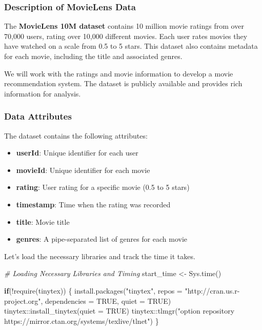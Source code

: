 \documentclass[
]{article}
\newenvironment{Shaded}{}{}
\newcommand{\AttributeTok}[1]{\textcolor[rgb]{0.49,0.56,0.16}{#1}}
\newcommand{\CommentTok}[1]{\textcolor[rgb]{0.38,0.63,0.69}{\textit{#1}}}
\newcommand{\ConstantTok}[1]{\textcolor[rgb]{0.53,0.00,0.00}{#1}}
\newcommand{\ControlFlowTok}[1]{\textcolor[rgb]{0.00,0.44,0.13}{\textbf{#1}}}
\newcommand{\FunctionTok}[1]{\textcolor[rgb]{0.02,0.16,0.49}{#1}}
\newcommand{\NormalTok}[1]{#1}
\newcommand{\OtherTok}[1]{\textcolor[rgb]{0.00,0.44,0.13}{#1}}
\newcommand{\SpecialCharTok}[1]{\textcolor[rgb]{0.25,0.44,0.63}{#1}}
\newcommand{\StringTok}[1]{\textcolor[rgb]{0.25,0.44,0.63}{#1}}
\providecommand{\tightlist}{%
  \setlength{\itemsep}{0pt}\setlength{\parskip}{0pt}}
\begin{document}
\subsubsection{Description of MovieLens
Data}\label{description-of-movielens-data}

The \textbf{MovieLens 10M dataset} contains 10 million movie ratings
from over 70,000 users, rating over 10,000 different movies. Each user
rates movies they have watched on a scale from 0.5 to 5 stars. This
dataset also contains metadata for each movie, including the title and
associated genres.

We will work with the ratings and movie information to develop a movie
recommendation system. The dataset is publicly available and provides
rich information for analysis.

\subsubsection{Data Attributes}\label{data-attributes}

The dataset contains the following attributes:

\begin{itemize}
\tightlist
\item
  \textbf{userId}: Unique identifier for each user
\item
  \textbf{movieId}: Unique identifier for each movie
\item
  \textbf{rating}: User rating for a specific movie (0.5 to 5 stars)
\item
  \textbf{timestamp}: Time when the rating was recorded
\item
  \textbf{title}: Movie title
\item
  \textbf{genres}: A pipe-separated list of genres for each movie
\end{itemize}

Let's load the necessary libraries and track the time it takes.

\begin{Shaded}
\begin{Highlighting}[]
\CommentTok{\# Loading Necessary Libraries and Timing}
\NormalTok{start\_time }\OtherTok{\textless{}{-}} \FunctionTok{Sys.time}\NormalTok{()}

\ControlFlowTok{if}\NormalTok{(}\SpecialCharTok{!}\FunctionTok{require}\NormalTok{(tinytex)) \{}
  \FunctionTok{install.packages}\NormalTok{(}\StringTok{"tinytex"}\NormalTok{, }\AttributeTok{repos =} \StringTok{"http://cran.us.r{-}project.org"}\NormalTok{, }
                   \AttributeTok{dependencies =} \ConstantTok{TRUE}\NormalTok{, }\AttributeTok{quiet =} \ConstantTok{TRUE}\NormalTok{)}
\NormalTok{  tinytex}\SpecialCharTok{::}\FunctionTok{install\_tinytex}\NormalTok{(}\AttributeTok{quiet =} \ConstantTok{TRUE}\NormalTok{)}
\NormalTok{  tinytex}\SpecialCharTok{::}\FunctionTok{tlmgr}\NormalTok{(}\StringTok{"option repository https://mirror.ctan.org/systems/texlive/tlnet"}\NormalTok{)}
\NormalTok{\}}
\end{Highlighting}
\end{Shaded}
\end{document}
